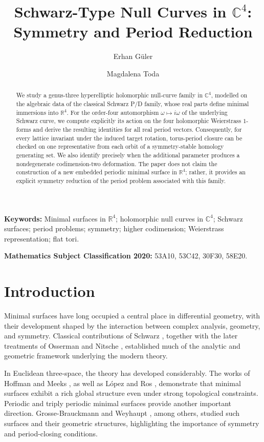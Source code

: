 \documentclass[12pt]{article}
\title{Schwarz-Type Null Curves in $\mathbb{C}^4$: Symmetry and Period Reduction}
\author{Erhan G\"uler \and Magdalena Toda }
\date{}
\numberwithin{equation}{section}
\theoremstyle{definition}
\theoremstyle{remark}
\begin{document}
\maketitle

\begin{abstract}
We study a genus-three hyperelliptic holomorphic null-curve family in
$\mathbb{C}^4$, modelled on the algebraic data of the classical Schwarz
P/D family, whose real parts define minimal immersions into
$\mathbb{R}^4$. For the order-four automorphism
$\omega\mapsto i\omega$ of the underlying Schwarz curve, we compute
explicitly its action on the four holomorphic Weierstrass $1$-forms and
derive the resulting identities for all real period vectors.
Consequently, for every lattice invariant under the induced target
rotation, torus-period closure can be checked on one representative
from each orbit of a symmetry-stable homology generating set. We also
identify precisely when the additional parameter produces a
nondegenerate codimension-two deformation. The paper does not claim
the construction of a new embedded periodic minimal surface in
$\mathbb{R}^4$; rather, it provides an explicit symmetry reduction of
the period problem associated with this family.
\end{abstract}

\noindent\textbf{Keywords:}
Minimal surfaces in $\mathbb{R}^4$; holomorphic null curves in
$\mathbb{C}^4$; Schwarz surfaces; period problems; symmetry; higher
codimension; Weierstrass representation; flat tori.

\medskip
\noindent\textbf{Mathematics Subject Classification 2020:}
53A10, 53C42, 30F30, 58E20.

\tableofcontents
\bigskip

\section{Introduction}

Minimal surfaces have long occupied a central place in differential
geometry, with their development shaped by the interaction between
complex analysis, geometry, and symmetry. Classical contributions of
Schwarz \cite{Schwarz}, together with the later treatments of Osserman
\cite{Osserman} and Nitsche \cite{Nitsche}, established much of the
analytic and geometric framework underlying the modern theory.

In Euclidean three-space, the theory has developed considerably.
The works of Hoffman and Meeks \cite{HoffmanMeeks}, as well as
López and Ros \cite{LopezRos}, demonstrate that minimal surfaces
exhibit a rich global structure even under strong topological
constraints. Periodic and triply periodic minimal surfaces provide
another important direction. Grosse-Brauckmann
\cite{GBrauckmannSurvey} and Weyhaupt \cite{WeyhauptGyroid}, among
others, studied such surfaces and their geometric structures,
highlighting the importance of symmetry and period-closing conditions.
\end{document}

